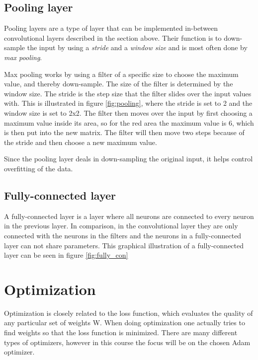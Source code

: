 \subsection{Pooling layer}
Pooling layers are a type of layer that can be implemented in-between convolutional layers described in the section above. Their function is to down-sample the input by using a \emph{stride} and a \emph{window size} and is most often done by \emph{max pooling}. 

Max pooling works by using a filter of a specific size to choose the maximum value, and thereby down-sample. The size of the filter is determined by the window size. The stride is the step size that the filter slides over the input values with. This is illustrated in figure \ref{fig:pooling}, where the stride is set to 2 and the window size is set to 2x2. The filter then moves over the input by first choosing a maximum value inside its area, so for the red area the maximum value is 6, which is then put into the new matrix. The filter will then move two steps because of the stride and then choose a new maximum value. 


Since the pooling layer deals in down-sampling the original input, it helps control overfitting of the data. 

\subsection{Fully-connected layer}
A fully-connected layer is a layer where all neurons are connected to every neuron in the previous layer. In comparison, in the convolutional layer they are only connected with the neurons in the filters and the neurons in a fully-connected layer can not share parameters.
This graphical illustration of a fully-connected layer can be seen in figure \ref{fig:fully_con}



\section{Optimization}
Optimization is closely related to the loss function, which evaluates the quality of any particular set of weights W. When doing optimization one actually tries to find weights so that the loss function is minimized. There are many different types of optimizers, however in this course the focus will be on the chosen Adam optimizer. 

